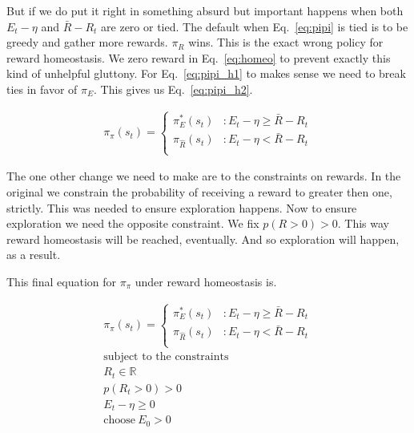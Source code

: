 \documentclass[9pt,lineno]{elife}
\begin{document}
But if we do put it right in something absurd but important happens when both $E_t - \eta$ and $\bar R - R_t$ are zero or tied. The default when Eq.~\ref{eq:pipi} is tied is to be greedy and gather more rewards. $\pi_R$ wins. This is the exact wrong policy for reward homeostasis. We zero reward in Eq.~\ref{eq:homeo} to prevent exactly this kind of unhelpful gluttony. For Eq.~\ref{eq:pipi_h1} to makes sense we need to break ties in favor of $\pi_E$. This gives us Eq.~\ref{eq:pipi_h2}.

\begin{equation}
    \label{eq:pipi_h2}
    \begin{split}
		\pi_{\pi}(s_t) = 
		\begin{cases}
			\pi^*_E(s_t) & : E_t - \eta \ge \bar R - R_t \\
			\pi_{\hat R}(s_t) & : E_t - \eta < \bar R - R_t \\
		\end{cases}	
	\end{split}
\end{equation}

The one other change we need to make are to the constraints on rewards. In the original we constrain the probability of receiving a reward to greater then one, strictly. This was needed to ensure exploration happens. Now to ensure exploration we need the opposite constraint. We fix $p(R > 0) > 0$. This way reward homeostasis will be reached, eventually. And so exploration will happen, as a result. 

This final equation for $\pi_{\pi}$ under reward homeostasis is.

\begin{equation}
    \label{eq:pipi_h3}
    \begin{split}
		\pi_{\pi}(s_t) = 
		\begin{cases}
			\pi^*_E(s_t) & : E_t - \eta \ge \bar R - R_t \\
			\pi_{\hat R}(s_t) & : E_t - \eta < \bar R - R_t \\
		\end{cases}	
		\\
	    \text{subject to the constraints}\\
		R_t \in \mathbb{R} \\
		p(R_t > 0) > 0 \\
		E_t - \eta \geq 0 \\
		\text{choose}\ E_0 > 0
	\end{split}
\end{equation}
\end{document}
